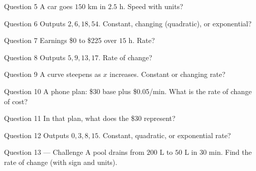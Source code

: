 \documentclass[11pt]{article}
\begin{document}
\begin{qbox}{Question 5}
A car goes $150$ km in $2.5$ h. Speed with units?\workspace{2.4cm}
\end{qbox}

\begin{qbox}{Question 6}
Outputs $2,6,18,54$. Constant, changing (quadratic), or exponential?\workspace{2.4cm}
\end{qbox}

\begin{qbox}{Question 7}
Earnings \$0 to \$225 over $15$ h. Rate?\workspace{2.4cm}
\end{qbox}

\begin{qbox}{Question 8}
Outputs $5,9,13,17$. Rate of change?\workspace{2.4cm}
\end{qbox}

\begin{qbox}{Question 9}
A curve steepens as $x$ increases. Constant or changing rate?\workspace{2.4cm}
\end{qbox}

\begin{qbox}{Question 10}
A phone plan: \$30 base plus \$0.05/min. What is the rate of change of cost?\workspace{2.4cm}
\end{qbox}

\begin{qbox}{Question 11}
In that plan, what does the \$30 represent?\workspace{2.4cm}
\end{qbox}

\begin{qbox}{Question 12}
Outputs $0,3,8,15$. Constant, quadratic, or exponential rate?\workspace{2.4cm}
\end{qbox}

\begin{qbox}{Question 13 --- Challenge}
A pool drains from $200$ L to $50$ L in $30$ min. Find the rate of change (with sign and units).\workspace{3cm}
\end{qbox}

\clearpage
{}
\end{document}
